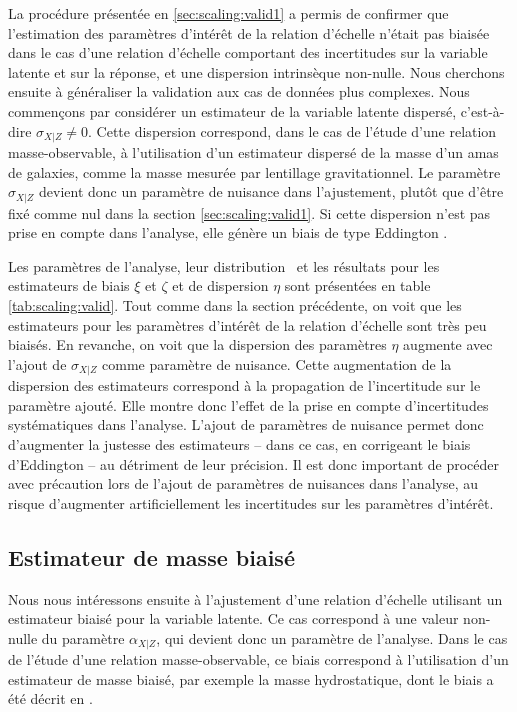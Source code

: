 La procédure présentée en \ref{sec:scaling:valid1} a permis de confirmer que l'estimation des paramètres d'intérêt de la relation d'échelle n'était pas biaisée dans le cas d'une relation d'échelle comportant des incertitudes sur la variable latente et sur la réponse, et une dispersion intrinsèque non-nulle.
Nous cherchons ensuite à généraliser la validation aux cas de données plus complexes.
Nous commençons par considérer un estimateur de la variable latente dispersé, c'est-à-dire $\sigma_{X|Z} \neq 0$.
Cette dispersion correspond, dans le cas de l'étude d'une relation masse-observable, à l'utilisation d'un estimateur dispersé de la masse d'un amas de galaxies, comme la masse mesurée par lentillage gravitationnel.
Le paramètre $\sigma_{X|Z}$ devient donc un paramètre de nuisance dans l'ajustement, plutôt que d'être fixé comme nul dans la section \ref{sec:scaling:valid1}.
Si cette dispersion n'est pas prise en compte dans l'analyse, elle génère un biais de type Eddington \cite{eddington_formula_1913,eddington_correction_1940}.

Les paramètres de l'analyse, leur distribution \prior\ et les résultats pour les estimateurs de biais $\xi$ et $\zeta$ et de dispersion $\eta$ sont présentées en table \ref{tab:scaling:valid}.
Tout comme dans la section précédente, on voit que les estimateurs pour les paramètres d'intérêt de la relation d'échelle sont très peu biaisés.
En revanche, on voit que la dispersion des paramètres $\eta$ augmente avec l'ajout de $\sigma_{X|Z}$ comme paramètre de nuisance.
Cette augmentation de la dispersion des estimateurs correspond à la propagation de l'incertitude sur le paramètre ajouté.
Elle montre donc l'effet de la prise en compte d'incertitudes systématiques dans l'analyse.
L'ajout de paramètres de nuisance permet donc d'augmenter la justesse des estimateurs -- dans ce cas, en corrigeant le biais d'Eddington -- au détriment de leur précision.
Il est donc important de procéder avec précaution lors de l'ajout de paramètres de nuisances dans l'analyse, au risque d'augmenter artificiellement les incertitudes sur les paramètres d'intérêt.

\subsection{Estimateur de masse biaisé}
\label{sec:scaling:valid3}

Nous nous intéressons ensuite à l'ajustement d'une relation d'échelle utilisant un estimateur biaisé pour la variable latente.
Ce cas correspond à une valeur non-nulle du paramètre $\alpha_{X|Z}$, qui devient donc un paramètre de l'analyse.
Dans le cas de l'étude d'une relation masse-observable, ce biais correspond à l'utilisation d'un estimateur de masse biaisé, par exemple la masse hydrostatique, dont le biais a été décrit en .

